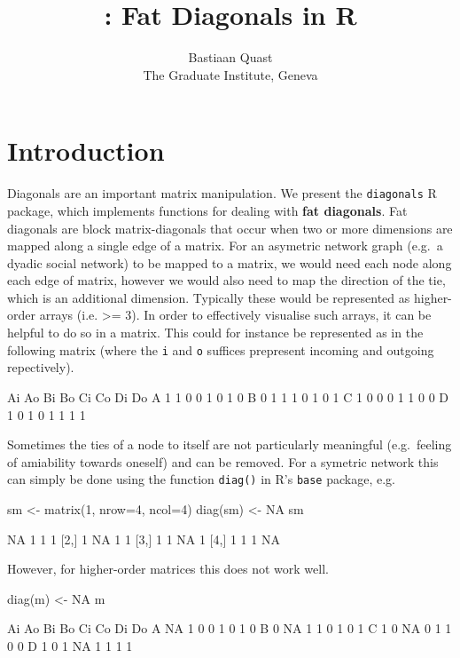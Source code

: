 \documentclass[article]{jss}
\author{
Bastiaan Quast\\The Graduate Institute, Geneva
}
\title{\pkg{diagonals}: Fat Diagonals in R}
\begin{document}
\section{Introduction}\label{introduction}

Diagonals are an important matrix manipulation. We present the
\texttt{diagonals} R package, which implements functions for dealing
with \textbf{fat diagonals}. Fat diagonals are block matrix-diagonals
that occur when two or more dimensions are mapped along a single edge of
a matrix. For an asymetric network graph (e.g.~a dyadic social network)
to be mapped to a matrix, we would need each node along each edge of
matrix, however we would also need to map the direction of the tie,
which is an additional dimension. Typically these would be represented
as higher-order arrays (i.e. \textgreater{}= 3). In order to effectively
visualise such arrays, it can be helpful to do so in a matrix. This
could for instance be represented as in the following matrix (where the
\texttt{i} and \texttt{o} suffices prepresent incoming and outgoing
repectively).

\begin{CodeChunk}
\begin{CodeOutput}
  Ai Ao Bi Bo Ci Co Di Do
A  1  1  0  0  1  0  1  0
B  0  1  1  1  0  1  0  1
C  1  0  0  0  1  1  0  0
D  1  0  1  0  1  1  1  1
\end{CodeOutput}
\end{CodeChunk}

Sometimes the ties of a node to itself are not particularly meaningful
(e.g.~feeling of amiability towards oneself) and can be removed. For a
symetric network this can simply be done using the function
\texttt{diag()} in R's \texttt{base} package, e.g.

\begin{CodeChunk}
\begin{CodeInput}
sm <- matrix(1, nrow=4, ncol=4)
diag(sm) <- NA
sm
\end{CodeInput}
\begin{CodeOutput}
     [,1] [,2] [,3] [,4]
[1,]   NA    1    1    1
[2,]    1   NA    1    1
[3,]    1    1   NA    1
[4,]    1    1    1   NA
\end{CodeOutput}
\end{CodeChunk}

However, for higher-order matrices this does not work well.

\begin{CodeChunk}
\begin{CodeInput}
diag(m) <- NA
m
\end{CodeInput}
\begin{CodeOutput}
  Ai Ao Bi Bo Ci Co Di Do
A NA  1  0  0  1  0  1  0
B  0 NA  1  1  0  1  0  1
C  1  0 NA  0  1  1  0  0
D  1  0  1 NA  1  1  1  1
\end{CodeOutput}
\end{CodeChunk}
\end{document}
